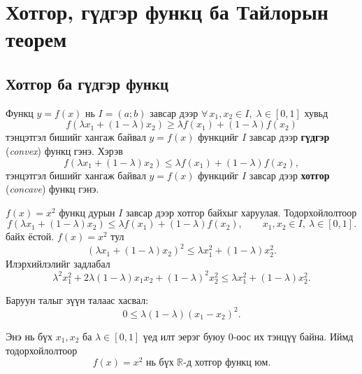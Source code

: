 \chapter{ Хотгор, гүдгэр функц ба Тайлорын теорем}
\section{Хотгор ба гүдгэр функц}
\begin{definition}
Функц $y=f(x)$ нь $I=(a;b)$ завсар дээр 
$ \forall\,x_1,x_2\in I,\; \lambda\in[0,1]$ хувьд 
\[
  f(\lambda x_1 + (1-\lambda)x_2)
  \geq \lambda f(x_1) + (1-\lambda)f(x_2) \] тэнцэтгэл бишийг хангаж байвал $y=f(x)$ функцийг $I$ завсар дээр 
  \textbf{гүдгэр} (\emph{convex}) функц гэнэ. Хэрэв 
  \[
  f(\lambda x_1 + (1-\lambda)x_2)
  \leq \lambda f(x_1) + (1-\lambda)f(x_2), 
  \] тэнцэтгэл бишийг хангаж байвал $y=f(x)$ функцийг $I$ завсар дээр 
  \textbf{хотгор} (\emph{concave}) функц гэнэ.
\end{definition}
\begin{example}
$f(x)=x^2$ функц дурын $I$ завсар дээр хотгор байхыг харуулая. Тодорхойлолтоор 
\[
f(\lambda x_1+(1-\lambda)x_2)
\leq
\lambda f(x_1)+(1-\lambda)f(x_2),
\qquad
x_1,x_2\in I,\ \lambda\in[0,1].
\]
байх ёстой.  $f(x)=x^2$ тул
\[
(\lambda x_1+(1-\lambda)x_2)^2
\le
\lambda x_1^2+(1-\lambda)x_2^2.
\]
Илэрхийлэлийг задлабал
\[
\lambda^2x_1^2+2\lambda(1-\lambda)x_1x_2+(1-\lambda)^2x_2^2
\le
\lambda x_1^2+(1-\lambda)x_2^2.
\]

Баруун талыг зүүн талаас хасвал:
\[
0
\le
\lambda(1-\lambda)(x_1-x_2)^2.
\]

Энэ нь бүх $x_1,x_2$ ба $\lambda\in[0,1]$ үед илт эерэг буюу $0$-оос их тэнцүү байна.  
Иймд тодорхойлолтоор
\[
\boxed{f(x)=x^2 \text{ нь бүх } \mathbb{R}\text{-д хотгор функц юм.}}
\]
\end{example}
\begin{center}
\end{center}
